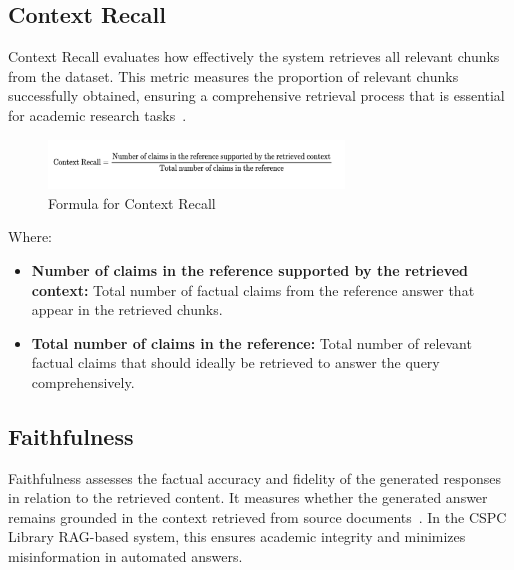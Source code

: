 \begin{refsection}
\newpage
\clearpage
\subsection*{Context Recall}

Context Recall evaluates how effectively the system retrieves all relevant chunks from the dataset. This metric measures the proportion of relevant chunks successfully obtained, ensuring a comprehensive retrieval process that is essential for academic research tasks~\cite{danter2024advanced}.


\begin{figure}[H]
\centering
\includegraphics[width=0.7\textwidth]{figures/context_recall_formula.png}
\caption{Formula for Context Recall}
\label{fig:context_recall}
\end{figure}

\noindent Where:
\begin{itemize}
    \item \textbf{Number of claims in the reference supported by the retrieved context:} Total number of factual claims from the reference answer that appear in the retrieved chunks.
    \item \textbf{Total number of claims in the reference:} Total number of relevant factual claims that should ideally be retrieved to answer the query comprehensively.
\end{itemize}

\newpage
\clearpage
\subsection*{Faithfulness}

Faithfulness assesses the factual accuracy and fidelity of the generated responses in relation to the retrieved content. It measures whether the generated answer remains grounded in the context retrieved from source documents~\cite{lin2024satisfaction}. In the CSPC Library RAG-based system, this ensures academic integrity and minimizes misinformation in automated answers.


\end{refsection}
